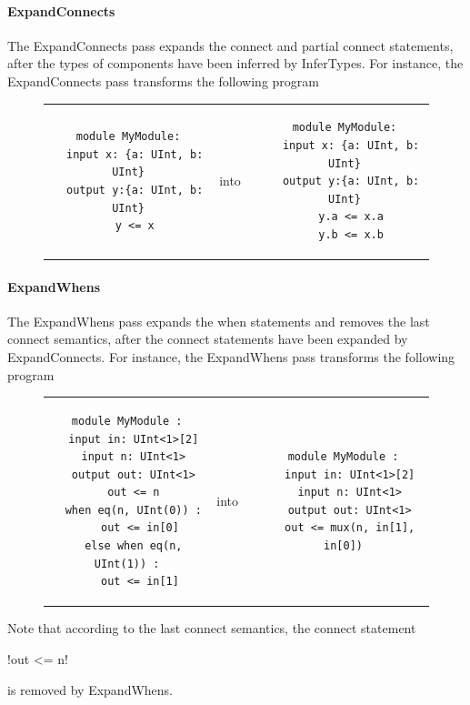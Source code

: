 \paragraph{ExpandConnects} The ExpandConnects pass expands the connect and partial connect statements, after the types of components have been inferred by InferTypes. For instance, the ExpandConnects pass transforms the following program
\begin{figure}[h]
\centering
\begin{tabular}{cccc}
\begin{lstlisting}[basicstyle=\scriptsize\ttfamily]
module MyModule:
  input x: {a: UInt, b: UInt}
  output y:{a: UInt, b: UInt}
  y <= x
\end{lstlisting} &
into
&
&
\begin{lstlisting}[basicstyle=\scriptsize\ttfamily]
module MyModule:
  input x: {a: UInt, b: UInt}
  output y:{a: UInt, b: UInt}
  y.a <= x.a
  y.b <= x.b
\end{lstlisting}
\end{tabular}
\end{figure}

\paragraph{ExpandWhens} The ExpandWhens pass expands the when statements and removes the last connect semantics, after the connect statements have been expanded by ExpandConnects. For instance, the ExpandWhens pass transforms the following program
\begin{figure}[h]
\centering
\begin{tabular}{cccc}
\begin{lstlisting}[basicstyle=\scriptsize\ttfamily]
module MyModule :
  input in: UInt<1>[2]
  input n: UInt<1>
  output out: UInt<1>
  out <= n
  when eq(n, UInt(0)) :
    out <= in[0]
  else when eq(n, UInt(1)) :
    out <= in[1]
\end{lstlisting}&
into
&
&
\begin{lstlisting}[basicstyle=\scriptsize\ttfamily] 
module MyModule :
  input in: UInt<1>[2]
  input n: UInt<1>
  output out: UInt<1>
  out <= mux(n, in[1], in[0])
\end{lstlisting}
\end{tabular}
\end{figure}

Note that according to the last connect semantics, the connect statement \begin{lstinline} !out <= n! \end{lstinline} is removed by ExpandWhens.

